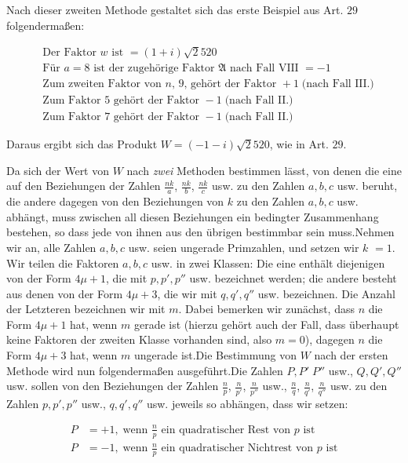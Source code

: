 Nach dieser zweiten Methode gestaltet sich das erste Beispiel aus Art. $29$ folgendermaßen:

{\small
\[
\begin{aligned}
&\text{Der Faktor }w\text{ ist }=(1+i)\surd2520\\
&\text{Für }a=8\text{ ist der zugehörige Faktor }\mathfrak A\text{ nach Fall VIII }=-1\\
&\text{Zum zweiten Faktor von }n\text{, }9\text{, gehört der Faktor }+1\;\text{(nach Fall III.)}\\
&\text{Zum Faktor }5\text{ gehört der Faktor }-1\;\text{(nach Fall II.)}\\
&\text{Zum Faktor }7\text{ gehört der Faktor }-1\;\text{(nach Fall II.)}
\end{aligned}
\]
}

Daraus ergibt sich das Produkt $W=(-1-i)\surd2520$, wie in Art. $29$.


Da sich der Wert von $W$ nach \textit{zwei} Methoden bestimmen lässt, von denen die eine auf den Beziehungen der Zahlen $\frac{nk}{a}$, $\frac{nk}{b}$, $\frac{nk}{c}$ usw. zu den Zahlen $a,b,c$ usw. beruht, die andere dagegen von den Beziehungen von $k$ zu den Zahlen $a,b,c$ usw. abhängt, muss zwischen all diesen Beziehungen ein bedingter Zusammenhang bestehen, so dass jede von ihnen aus den übrigen bestimmbar sein muss.\quad Nehmen wir an, alle Zahlen $a,b,c$ usw. seien ungerade Primzahlen, und setzen wir $k$ $=1$. Wir teilen die Faktoren $a,b,c$ usw. in zwei Klassen: Die eine enthält diejenigen von der Form $4\mu+1$, die mit $p,p',p''$ usw. bezeichnet werden; die andere besteht aus denen von der Form $4\mu+3$, die wir mit $q,q',q''$ usw. bezeichnen. Die Anzahl der Letzteren bezeichnen wir mit $m$. Dabei bemerken wir zunächst, dass $n$ die Form $4\mu+1$ hat, wenn $m$ gerade ist (hierzu gehört auch der Fall, dass überhaupt keine Faktoren der zweiten Klasse vorhanden sind, also $m=0$), dagegen $n$ die Form $4\mu+3$ hat, wenn $m$ ungerade ist.\quad Die Bestimmung von $W$ nach der ersten Methode wird nun folgendermaßen ausgeführt.\quad Die Zahlen $P,P'\;P''$ usw., $Q,Q',Q''$ usw. sollen von den Beziehungen der Zahlen $\frac{n}{p}$, $\frac{n}{p'}$, $\frac{n}{p''}$ usw., $\frac{n}{q}$, $\frac{n}{q'}$, $\frac{n}{q''}$ usw. zu den Zahlen $p,p',p''$ usw., $q,q',q''$ usw. jeweils so abhängen, dass wir setzen:

\[
\begin{aligned}
P&=+1,\;\text{wenn }\frac{n}{p}\text{ ein quadratischer Rest von }p\text{ ist}\\
P&=-1,\;\text{wenn }\frac{n}{p}\text{ ein quadratischer Nichtrest von }p\text{ ist}
\end{aligned}
\]

